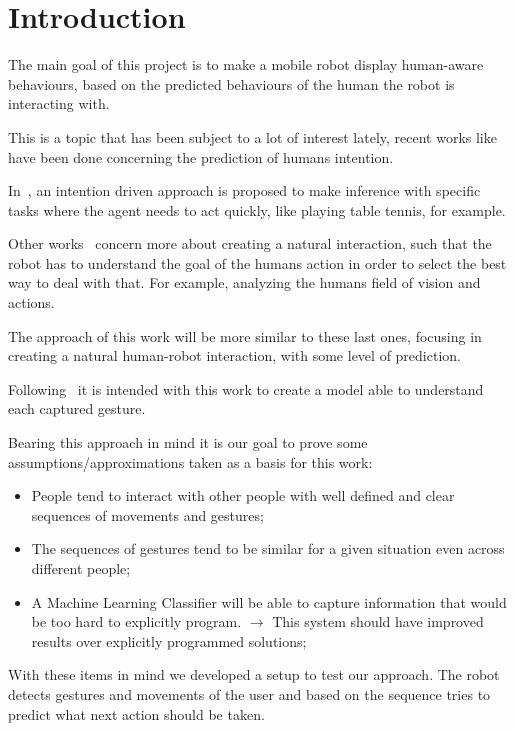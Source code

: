 
\section{Introduction}
The main goal of this project is to make a mobile robot display human-aware behaviours, based on the predicted behaviours of the human the robot is interacting with. 

This is a topic that has been subject to a lot of interest lately, recent works like~\cite{hof} have been done concerning the prediction of humans intention.

In~\cite{wang}, an intention driven approach is proposed to make inference with specific tasks where the agent needs to act quickly, like playing table tennis, for example. 

Other works~\cite{towards,shared} concern more about creating a natural interaction, such that the robot has to understand the goal of the humans action in order to select the best way to deal with that. For example, analyzing the humans field of vision and actions. 

The approach of this work will be more similar to these last ones, focusing in creating a natural human-robot interaction, with some level of prediction. 

Following~\cite{Gesture recognition,body} it is intended with this work to create a model able to understand each captured gesture.

Bearing this approach in mind it is our goal to prove some assumptions/approximations taken as a basis for this work:  

\begin{itemize}
\item People tend to interact with other people with well defined and clear sequences of movements and gestures;
\item The sequences of gestures tend to be similar for a given situation even across different people;
\item A Machine Learning Classifier will be able to capture information that would be too hard to explicitly program. $\rightarrow$ This system should have improved results over explicitly programmed solutions;
\end{itemize}

With these items in mind we developed a setup to test our approach. The robot detects gestures and movements of the user and based on the sequence tries to predict what next action should be taken.